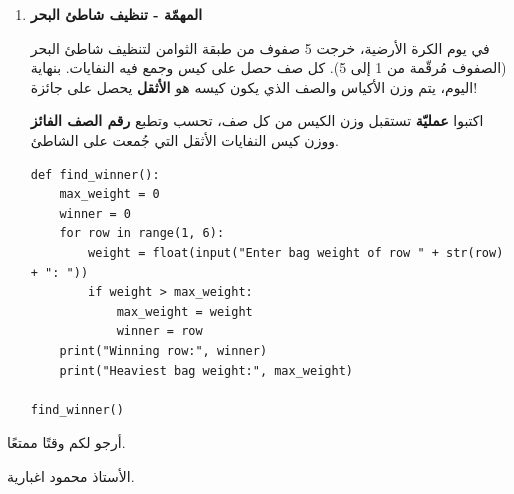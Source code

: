 \documentclass[14pt]{extarticle}
\begin{document}
\begin{enumerate}[itemsep=3em]
\item \textbf{المهمّة - تنظيف شاطئ البحر}

في يوم الكرة الأرضية، خرجت 5 صفوف من طبقة الثوامن لتنظيف شاطئ البحر (الصفوف مُرقّمة من 1 إلى 5). كل صف حصل على كيس وجمع فيه النفايات. بنهاية اليوم، يتم وزن الأكياس والصف الذي يكون كيسه هو \textbf{الأثقل} يحصل على جائزة!

اكتبوا \textbf{عمليّة} تستقبل وزن الكيس من كل صف، تحسب وتطبع \textbf{رقم الصف الفائز} ووزن كيس النفايات الأثقل التي جُمعت على الشاطئ.

\ifwithsols
\begin{boxSolution}
\begin{english}
\begin{verbatim}
def find_winner():
    max_weight = 0
    winner = 0
    for row in range(1, 6):
        weight = float(input("Enter bag weight of row " + str(row) + ": "))
        if weight > max_weight:
            max_weight = weight
            winner = row
    print("Winning row:", winner)
    print("Heaviest bag weight:", max_weight)

find_winner()
\end{verbatim}
\end{english}
\end{boxSolution}
\fi

\end{enumerate}

\vspace{1cm}
\begin{flushleft}
أرجو لكم وقتًا ممتعًا.

الأستاذ محمود اغبارية.
\end{flushleft}
\end{document}
